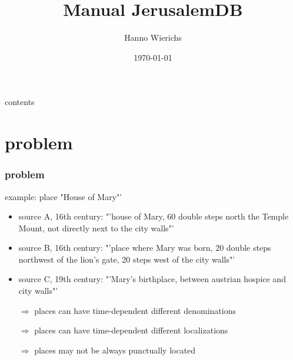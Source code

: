 \documentclass{beamer}
\title{Manual JerusalemDB}
\author{Hanno Wierichs}
\institute{}
\date{\today}
\begin{document}
	\begin{frame}[plain]
		\titlepage
	\end{frame}

	\begin{frame}{contents}
		\tableofcontents
	\end{frame} 


\section{problem} 
		\begin{frame}
			\frametitle{problem}
	example: place "House of Mary"'
					\begin{itemize}
						\item source A, 16th century: "'house of Mary, 60 double steps north the Temple Mount, not directly next to the city walls"'
						\item source B, 16th century: "'place where Mary was born, 20 double steps northwest of the lion's gate, 20 steps west of the city walls"'
						\item source C, 19th century: "'Mary's birthplace, between austrian hospice and city walls"'
					\end{itemize}					 
					\vspace{1ex}
					\begin{itemize}
						\item[$\Rightarrow$] places can have time-dependent different denominations
						\item[$\Rightarrow$] places can have time-dependent different localizations
						\item[$\Rightarrow$] places may not be always punctually located
					\end{itemize}					 					
	\end{frame}
	
	
\end{document}
